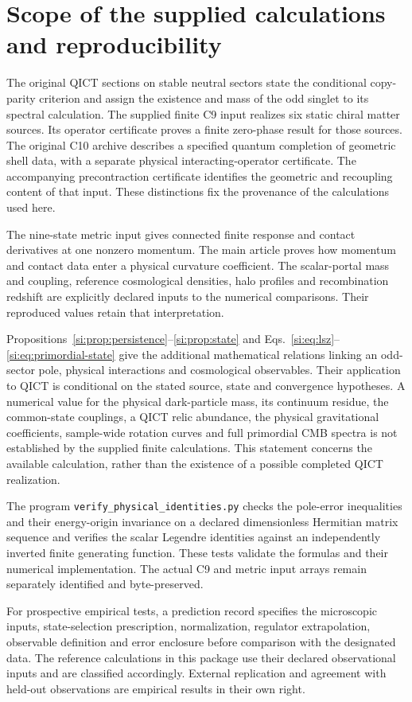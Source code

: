 \documentclass[11pt,a4paper]{article}
\begin{document}
\section{Scope of the supplied calculations and reproducibility}
\label{si:scope}
The original QICT sections on stable neutral sectors state the conditional copy-parity criterion and assign the existence and mass of the odd singlet to its spectral calculation. The supplied finite C9 input realizes six static chiral matter sources. Its operator certificate proves a finite zero-phase result for those sources. The original C10 archive describes a specified quantum completion of geometric shell data, with a separate physical interacting-operator certificate. The accompanying precontraction certificate identifies the geometric and recoupling content of that input. These distinctions fix the provenance of the calculations used here.

The nine-state metric input gives connected finite response and contact derivatives at one nonzero momentum. The main article proves how momentum and contact data enter a physical curvature coefficient. The scalar-portal mass and coupling, reference cosmological densities, halo profiles and recombination redshift are explicitly declared inputs to the numerical comparisons. Their reproduced values retain that interpretation.

Propositions~\ref{si:prop:persistence}--\ref{si:prop:state} and Eqs.~\eqref{si:eq:lsz}--\eqref{si:eq:primordial-state} give the additional mathematical relations linking an odd-sector pole, physical interactions and cosmological observables. Their application to QICT is conditional on the stated source, state and convergence hypotheses. A numerical value for the physical dark-particle mass, its continuum residue, the common-state couplings, a QICT relic abundance, the physical gravitational coefficients, sample-wide rotation curves and full primordial CMB spectra is not established by the supplied finite calculations. This statement concerns the available calculation, rather than the existence of a possible completed QICT realization.

The program \texttt{verify\_physical\_identities.py} checks the pole-error inequalities and their energy-origin invariance on a declared dimensionless Hermitian matrix sequence and verifies the scalar Legendre identities against an independently inverted finite generating function. These tests validate the formulas and their numerical implementation. The actual C9 and metric input arrays remain separately identified and byte-preserved.

For prospective empirical tests, a prediction record specifies the microscopic inputs, state-selection prescription, normalization, regulator extrapolation, observable definition and error enclosure before comparison with the designated data. The reference calculations in this package use their declared observational inputs and are classified accordingly. External replication and agreement with held-out observations are empirical results in their own right.


\end{document}
